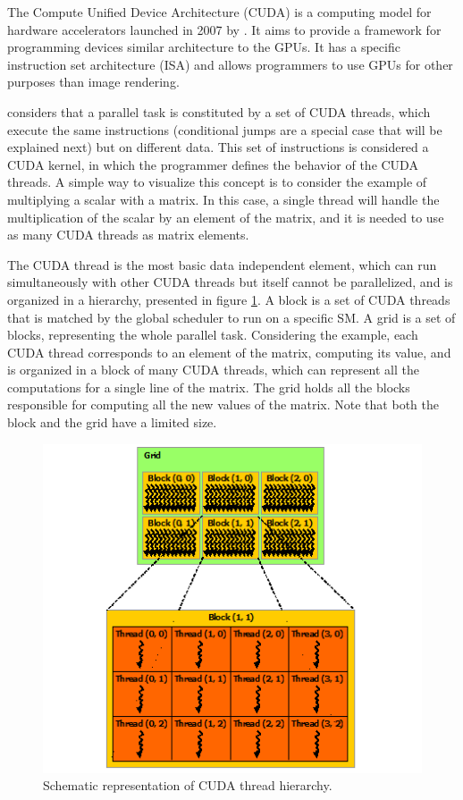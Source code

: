 The Compute Unified Device Architecture (CUDA) is a computing model for hardware accelerators launched in 2007 by \nvidia. It aims to provide a framework for programming devices similar architecture to the \nvidia GPUs. It has a specific instruction set architecture (ISA) and allows programmers to use GPUs for other purposes than image rendering.

\nvidia considers that a parallel task is constituted by a set of CUDA threads, which execute the same instructions (conditional jumps are a special case that will be explained next) but on different data. This set of instructions is considered a CUDA kernel, in which the programmer defines the behavior of the CUDA threads. A simple way to visualize this concept is to consider the example of multiplying a scalar with a matrix. In this case, a single thread will handle the multiplication of the scalar by an element of the matrix, and it is needed to use as many CUDA threads as matrix elements.

The CUDA thread is the most basic data independent element, which can run simultaneously with other CUDA threads but itself cannot be parallelized, and is organized in a hierarchy, presented in figure \ref{fig:CUDAHierarchy}. A block is a set of CUDA threads that is matched by the global scheduler to run on a specific SM. A grid is a set of blocks, representing the whole parallel task. Considering the example, each CUDA thread corresponds to an element of the matrix, computing its value, and is organized in a block of many CUDA threads, which can represent all the computations for a single line of the matrix. The grid holds all the blocks responsible for computing all the new values of the matrix. Note that both the block and the grid have a limited size.

\begin{figure}[!htp]
	\begin{center}
		\includegraphics[scale=0.8]{../../common/img/cuda_hierarchy.png}
		\caption{Schematic representation of CUDA thread hierarchy.}
		\label{fig:CUDAHierarchy}
	\end{center}
\end{figure}

